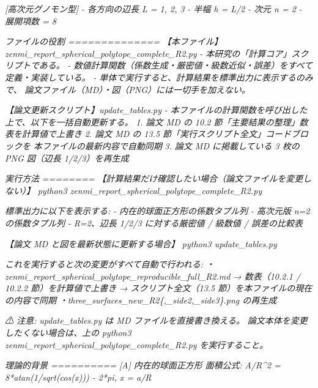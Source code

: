 \documentclass[
  12pt,
  a4paper,
]{article}
\newenvironment{Shaded}{}{}
\newcommand{\CommentTok}[1]{\textcolor[rgb]{0.38,0.63,0.69}{\textit{#1}}}
\begin{document}
\begin{Shaded}
\begin{Highlighting}[]
\CommentTok{[高次元グノモン型]}
\CommentTok{{-} 各方向の辺長 L = 1, 2, 3}
\CommentTok{{-} 半幅 h = L/2}
\CommentTok{{-} 次元 n = 2}
\CommentTok{{-} 展開項数 = 8}

\CommentTok{ファイルの役割}
\CommentTok{==============}
\CommentTok{【本ファイル】zenmi\_report\_spherical\_polytope\_complete\_R2.py}
\CommentTok{    {-} 本研究の「計算コア」スクリプトである。}
\CommentTok{    {-} 数値計算関数（係数生成・厳密値・級数近似・誤差）をすべて定義・実装している。}
\CommentTok{    {-} 単体で実行すると、計算結果を標準出力に表示するのみで、}
\CommentTok{      論文ファイル（MD）・図（PNG）には一切手を加えない。}

\CommentTok{【論文更新スクリプト】update\_tables.py}
\CommentTok{    {-} 本ファイルの計算関数を呼び出した上で、以下を一括自動更新する。}
\CommentTok{        1. 論文 MD の 10.2 節「主要結果の整理」数表を計算値で上書き}
\CommentTok{        2. 論文 MD の 13.5 節「実行スクリプト全文」コードブロックを}
\CommentTok{           本ファイルの最新内容で自動同期}
\CommentTok{        3. 論文 MD に掲載している 3 枚の PNG 図（辺長 1/2/3）を再生成}

\CommentTok{実行方法}
\CommentTok{========}
\CommentTok{【計算結果だけ確認したい場合（論文ファイルを変更しない）】}
\CommentTok{    python3 zenmi\_report\_spherical\_polytope\_complete\_R2.py}

\CommentTok{    標準出力に以下を表示する:}
\CommentTok{        {-} 内在的球面正方形の係数タプル列}
\CommentTok{        {-} 高次元版 n=2 の係数タプル列}
\CommentTok{        {-} R=2、辺長 1/2/3 に対する厳密値 / 級数値 / 誤差の比較表}

\CommentTok{【論文 MD と図を最新状態に更新する場合】}
\CommentTok{    python3 update\_tables.py}

\CommentTok{    これを実行すると次の変更がすべて自動で行われる:}
\CommentTok{        ・zenmi\_report\_spherical\_polytope\_reproducible\_full\_R2.md}
\CommentTok{            → 数表（10.2.1 / 10.2.2 節）を計算値で上書き}
\CommentTok{            → スクリプト全文（13.5 節）を本ファイルの現在の内容で同期}
\CommentTok{        ・three\_surfaces\_new\_R2\{,\_side2,\_side3\}.png の再生成}

\CommentTok{    ⚠ 注意: update\_tables.py は MD ファイルを直接書き換える。}
\CommentTok{            論文本体を変更したくない場合は、上の}
\CommentTok{            python3 zenmi\_report\_spherical\_polytope\_complete\_R2.py}
\CommentTok{            を実行すること。}

\CommentTok{理論的背景}
\CommentTok{==========}
\CommentTok{[A] 内在的球面正方形}
\CommentTok{    面積公式:}
\CommentTok{        A/R\^{}2 = 8*atan(1/sqrt(cos(x))) {-} 2*pi,   x = a/R}


\end{Highlighting}
\end{Shaded}
\end{document}
